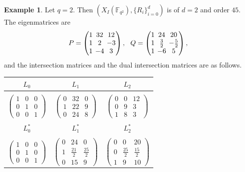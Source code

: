 \documentclass[11pt]{amsart}
\newcommand{\pmat}[1]{\begin{pmatrix} #1 \end{pmatrix}}
\theoremstyle{plain} %
\theoremstyle{definition} %
\newtheorem{ex}[thm]{Example} %
\theoremstyle{remark} %
\begin{document}
\begin{ex}%
Let $q=2$.
Then $(X_I(\mathbb{F}_{q^2}),\{R_i\}_{i=0}^d)$ is of $d=2$ and order $45$. The eigenmatrices are
$$
\setlength{\arraycolsep}{2pt}
P=\pmat{
1&32&12\\
1&2&-3\\
1&-4&3
}
,
\ \ 
Q=\pmat{
1&24&20\\
1&\frac{3}{2}&-\frac{5}{2}\\
1&-6&5
},
$$
and the intersection matrices and the dual intersection matrices are as follows.
\begin{table}[H]
  \setlength{\arraycolsep}{1.7pt}
\renewcommand{\arraystretch}{1.0}
  \begin{center}
      \begin{tabular}{ccc}
      \\
           $L_0$&$L_1$&$L_2$\\
\hline%
\\
$\pmat{1&0&0\\0&1&0\\0&0&1}$&$\pmat{0 & 32 & 0 \\
1 & 22 & 9 \\
0 & 24 & 8}$&$\pmat{0 & 0 & 12 \\
0 & 9 & 3 \\
1 & 8 & 3}$\\
\\
$L^*_0$&$L^*_1$&$L^*_2$\\
\hline%
\\
$\pmat{1&0&0\\0&1&0\\0&0&1}$
&$\pmat{0 & 24 & 0 \\
1 & \tfrac{21}{2} & \tfrac{25}{2} \\
0 & 15 & 9}$
&$\pmat{0 & 0 & 20 \\
0 & \tfrac{25}{2} & \tfrac{15}{2} \\
1 & 9 & 10}$
      \end{tabular}
  \end{center}
\end{table}
\end{ex}
\end{document}
